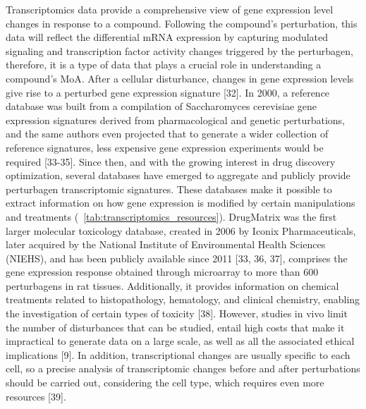 Transcriptomics data provide a comprehensive view of gene expression level changes in response to a compound. Following the compound’s perturbation, this data will reflect the differential mRNA expression by capturing modulated signaling and transcription factor activity changes triggered by the perturbagen, therefore, it is a type of data that plays a crucial role in understanding a compound's MoA. After a cellular disturbance, changes in gene expression levels give rise to a perturbed gene expression signature [32]. In 2000, a reference database was built from a compilation of Saccharomyces cerevisiae gene expression signatures derived from pharmacological and genetic perturbations, and the same authors even projected that to generate a wider collection of reference signatures, less expensive gene expression experiments would be required [33-35]. Since then, and with the growing interest in drug discovery optimization, several databases have emerged to aggregate and publicly provide perturbagen transcriptomic signatures. These databases make it possible to extract information on how gene expression is modified by certain manipulations and treatments (~\ref{tab:transcriptomics_resources}). 
DrugMatrix was the first larger molecular toxicology database, created in 2006 by Iconix Pharmaceuticals, later acquired by the National Institute of Environmental Health Sciences (NIEHS), and has been publicly available since 2011 [33, 36, 37], comprises the gene expression response obtained through microarray to more than 600 perturbagens in rat tissues.  Additionally, it provides information on chemical treatments related to histopathology, hematology, and clinical chemistry, enabling the investigation of certain types of toxicity [38]. However, studies in vivo limit the number of disturbances that can be studied, entail high costs that make it impractical to generate data on a large scale, as well as all the associated ethical implications [9]. In addition, transcriptional changes are usually specific to each cell, so a precise analysis of transcriptomic changes before and after perturbations should be carried out, considering the cell type, which requires even more resources [39].
